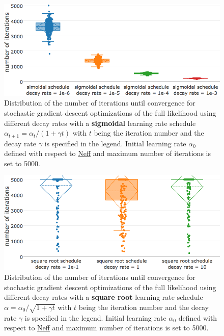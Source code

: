 \documentclass[11pt,a4paper,twoside]{book}
\theoremstyle{definition}
\theoremstyle{definition}
\theoremstyle{remark}
\begin{document}
\begin{figure}

{\centering \includegraphics[width=0.9\linewidth]{img/full_likelihood/appendix/distribution_numiterations_against_sigmoidal_learningrate_schedule} 

}

\caption{Distribution of the
number of iterations until convergence for stochastic gradient descent
optimizations of the full likelihood using different decay rates with a
\textbf{sigmoidal} learning rate schedule
\(\alpha_{t+1} = \alpha_{t} / (1 + \gamma t)\) with \(t\) being the
iteration number and the decay rate \(\gamma\) is specified in the
legend. Initial learning rate \(\alpha_0\) defined with respect to
\protect\hyperlink{abbrev}{Neff} and maximum number of iterations is set
to 5000.}\label{fig:cd-numit-sig-learning-rate-schedule}
\end{figure}











\begin{figure}

{\centering \includegraphics[width=0.9\linewidth]{img/full_likelihood/appendix/distribution_numiterations_against_sqrt_learningrate_schedule} 

}

\caption{Distribution of the
number of iterations until convergence for stochastic gradient descent
optimizations of the full likelihood using different decay rates with a
\textbf{square root} learning rate schedule
\(\alpha = \alpha_0 / \sqrt{1 + \gamma t}\) with \(t\) being the
iteration number and the decay rate \(\gamma\) is specified in the
legend. Initial learning rate \(\alpha_0\) defined with respect to
\protect\hyperlink{abbrev}{Neff} and maximum number of iterations is set
to 5000.}\label{fig:cd-numit-sqrt-learning-rate-schedule}
\end{figure}
\end{document}
